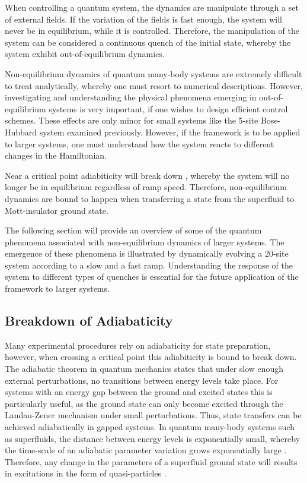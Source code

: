 When controlling a quantum system, the dynamics are manipulate through a set of external fields. If the variation of the fields is fast enough, the system will never be in equilibrium, while it is controlled. Therefore, the manipulation of the system can be considered a continuous quench of the initial state, whereby the system exhibit out-of-equilibrium dynamics.

Non-equilibrium dynamics of quantum many-body systems are extremely difficult to treat analytically, whereby one must resort to numerical descriptions. However, investigating and understanding the physical phenomena emerging in out-of-equilibrium systems is very important, if one wishes to design efficient control schemes. These effects are only minor for small systems like the 5-site Bose-Hubbard system examined previously. However, if the framework is to be applied to larger systems, one must understand how the system reacts to different changes in the Hamiltonian. 

Near a critical point adiabiticity will break down \cite{Zurek2005}, whereby the system will no longer be in equilibrium regardless of ramp speed. Therefore, non-equilibrium dynamics are bound to happen when transferring a state from the superfluid to Mott-insulator ground state.

The following section will provide an overview of some of the quantum phenomena associated with non-equilibrium dynamics of larger systems. The emergence of these phenomena is illustrated by dynamically evolving a 20-site system according to a slow and a fast ramp. Understanding the response of the system to different types of quenches is essential for the future application of the framework to larger systems.


\subsection{Breakdown of Adiabaticity}
Many experimental procedures rely on adiabaticity for state preparation, however, when crossing a critical point this adiabiticity is bound to break down.
The adiabatic theorem in quantum mechanics states that under slow enough external perturbations, no transitions between energy levels take place. For systems with an energy gap between the ground and excited states this is particularly useful, as the ground state can only become excited through the Landau-Zener mechanism \cite{Landau1932,Zener1932} under small perturbations. Thus, state transfers can be achieved adiabatically in gapped systems. In quantum many-body systems such as superfluids, the distance between energy levels is exponentially small, whereby the time-scale of an adiabatic parameter variation grows exponentially large \cite{Polkovnikov2008}. Therefore, any change in the parameters of a superfluid ground state will results in excitations in the form of quasi-particles \cite{Polkovnikov2008,Ozeri2005}.  

